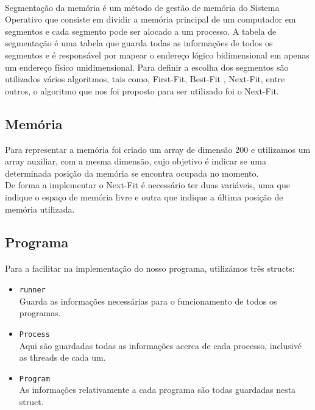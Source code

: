\documentclass{article}
\begin{document}
\paragraph{}
Segmentação da memória é um método de gestão de memória do Sistema Operativo que consiste em dividir a memória principal de um computador em segmentos e cada segmento pode ser alocado a um processo. A tabela de segmentação é uma tabela que guarda todas as informações de todos os segmentos e é responsável por mapear o endereço lógico bidimensional em apenas um endereço físico unidimensional. Para definir a escolha dos segmentos são utilizados vários algoritmos, tais como, First-Fit, Best-Fit , Next-Fit, entre outros, o algoritmo que nos foi proposto para ser utilizado foi o Next-Fit.

\begin{center}
    \section*{Memória}
\end{center}

Para representar a memória foi criado um array de dimensão 200 e utilizamos um array auxiliar, com a mesma dimensão, cujo objetivo é indicar se uma determinada posição da memória se encontra ocupada no momento.\\

De forma a implementar o Next-Fit é necessário ter duas variáveis, uma que indique o espaço de memória livre e outra que indique a última posição de memória utilizada.\\

\begin{center}
    \section*{Programa}
\end{center}

\paragraph{}
Para a facilitar na implementação do nosso programa, utilizámos três structs:
\begin{itemize}
    \item \verb|runner|\\
    Guarda as informações necessárias para o funcionamento de todos os programas.
    \item \verb|Process|\\
    Aqui são guardadas todas as informações acerca de cada processo, inclusivé as threads de cada um.
    \item \verb|Program|\\
    As informações relativamente a cada programa são todas guardadas nesta struct.
\end{itemize}
\end{document}
